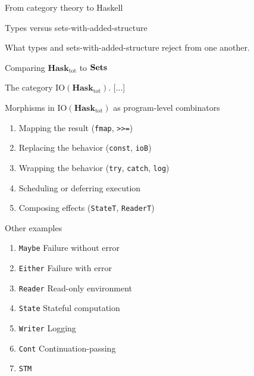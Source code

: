 \documentclass[11pt, a4paper]{article}
\begin{document}
\begin{section}{From category theory to Haskell}
\begin{subsection}{Types versus sets-with-added-structure}
\begin{subsubsection}{What types and sets-with-added-structure reject from one another.}

\end{subsubsection}

\end{subsection}

\begin{subsection}{Comparing $\mathbf{Hask}_\text{tot}$ to $\bold{Sets}$}
\end{subsection}

\begin{subsection}{The category $\text{IO}(\mathbf{Hask}_\text{tot})$.}
[...]

\begin{subsubsection}{Morphisms in $\text{IO}(\mathbf{Hask}_{\text{tot}})$ as program-level combinators}
\begin{enumerate}
\item
Mapping the result (\texttt{fmap}, \texttt{>>=})
\item
Replacing the behavior (\texttt{const}, \texttt{ioB})
\item
Wrapping the behavior (\texttt{try}, \texttt{catch}, \texttt{log})
\item
Scheduling or deferring execution
\item
Composing effects (\texttt{StateT}, \texttt{ReaderT})
\end{enumerate}
\end{subsubsection}

\end{subsection}

\begin{subsection}{Other examples}
\begin{enumerate}
\item
\texttt{Maybe}	Failure without error
\item
\texttt{Either}	Failure with error
\item
\texttt{Reader}	Read-only environment
\item
\texttt{State}	Stateful computation
\item
\texttt{Writer}	Logging
\item
\texttt{Cont}	Continuation-passing
\item
\texttt{STM}
\end{enumerate}
\end{subsection}


\end{section}
\end{document}
